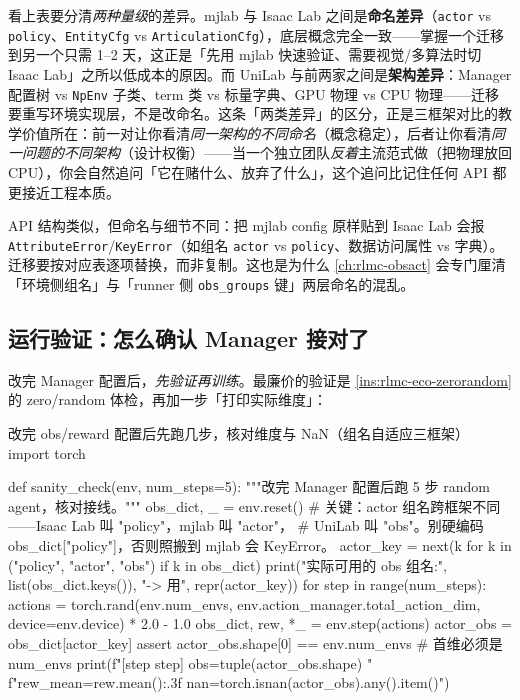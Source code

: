 \begin{insight}\label{ins:rlmc-eco-pickright}
看上表要分清\emph{两种量级}的差异。mjlab 与 Isaac Lab 之间是\textbf{命名差异}（\verb|actor| vs \verb|policy|、\verb|EntityCfg| vs \verb|ArticulationCfg|），底层概念完全一致——掌握一个迁移到另一个只需 1--2 天，这正是「先用 mjlab 快速验证、需要视觉/多算法时切 Isaac Lab」之所以低成本的原因。而 UniLab 与前两家之间是\textbf{架构差异}：Manager 配置树 vs \verb|NpEnv| 子类、term 类 vs 标量字典、GPU 物理 vs CPU 物理——迁移要重写环境实现层，不是改命名。这条「两类差异」的区分，正是三框架对比的教学价值所在：前一对让你看清\emph{同一架构的不同命名}（概念稳定），后者让你看清\emph{同一问题的不同架构}（设计权衡）——当一个独立团队\emph{反着}主流范式做（把物理放回 CPU），你会自然追问「它在赌什么、放弃了什么」，这个追问比记住任何 API 都更接近工程本质。
\end{insight}

\begin{pitfall}
API 结构类似，但命名与细节不同：把 mjlab config 原样贴到 Isaac Lab 会报 \verb|AttributeError|/\verb|KeyError|（如组名 \verb|actor| vs \verb|policy|、数据访问属性 vs 字典）。迁移要按对应表逐项替换，而非复制。这也是为什么 \cref{ch:rlmc-obsact} 会专门厘清「环境侧组名」与「runner 侧 \texttt{obs\_groups} 键」两层命名的混乱。
\end{pitfall}

\subsection{运行验证：怎么确认 Manager 接对了}

改完 Manager 配置后，\emph{先验证再训练}。最廉价的验证是 \cref{ins:rlmc-eco-zerorandom} 的 zero/random 体检，再加一步「打印实际维度」：

\begin{codebox}[Python]{改完 obs/reward 配置后先跑几步，核对维度与 NaN（组名自适应三框架）}
import torch

def sanity_check(env, num_steps=5):
    """改完 Manager 配置后跑 5 步 random agent，核对接线。"""
    obs_dict, _ = env.reset()
    # 关键：actor 组名跨框架不同——Isaac Lab 叫 "policy"，mjlab 叫 "actor"，
    # UniLab 叫 "obs"。别硬编码 obs_dict["policy"]，否则照搬到 mjlab 会 KeyError。
    actor_key = next(k for k in ("policy", "actor", "obs") if k in obs_dict)
    print("实际可用的 obs 组名:", list(obs_dict.keys()), "-> 用", repr(actor_key))
    for step in range(num_steps):
        actions = torch.rand(env.num_envs,
                             env.action_manager.total_action_dim,
                             device=env.device) * 2.0 - 1.0
        obs_dict, rew, *_ = env.step(actions)
        actor_obs = obs_dict[actor_key]
        assert actor_obs.shape[0] == env.num_envs        # 首维必须是 num_envs
        print(f"[step {step}] obs={tuple(actor_obs.shape)} "
              f"rew_mean={rew.mean():.3f} nan={torch.isnan(actor_obs).any().item()}")
\end{codebox}

